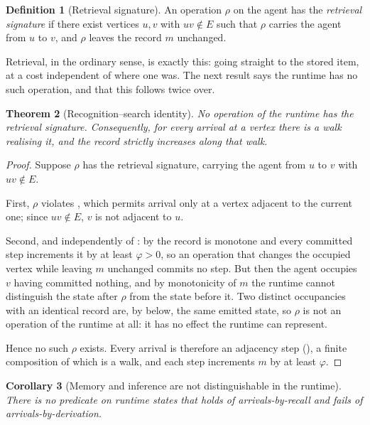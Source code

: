 \documentclass[11pt,a4paper]{article}
\theoremstyle{clstyle}
\newtheorem{theorem}{Theorem}[section]
\newtheorem{corollary}[theorem]{Corollary}
\theoremstyle{definition}
\newtheorem{definition}[theorem]{Definition}
\theoremstyle{remark}
\newcommand{\rec}{m}
\begin{document}
\begin{definition}[Retrieval signature]
\label{def:retrieval}
An operation $\rho$ on the agent has the \emph{retrieval signature} if there
exist vertices $u,v$ with $uv\notin E$ such that $\rho$ carries the agent
from $u$ to $v$, and $\rho$ leaves the record $\rec$ unchanged.
\end{definition}

Retrieval, in the ordinary sense, is exactly this: going straight to the
stored item, at a cost independent of where one was. The next result says
the runtime has no such operation, and that this follows twice over.

\begin{theorem}[Recognition--search identity]
\label{thm:recognition}
No operation of the runtime has the retrieval signature. Consequently, for
every arrival at a vertex there is a walk realising it, and the record
strictly increases along that walk.
\end{theorem}

\begin{proof}
Suppose $\rho$ has the retrieval signature, carrying the agent from $u$ to
$v$ with $uv\notin E$.

First, $\rho$ violates , which permits arrival only at a
vertex adjacent to the current one; since $uv\notin E$, $v$ is not adjacent
to $u$.

Second, and independently of : by  the
record is monotone and every committed step increments it by at least
$\varphi>0$, so an operation that changes the occupied vertex while leaving
$\rec$ unchanged commits no step. But then the agent occupies $v$ having
committed nothing, and by monotonicity of $\rec$ the runtime cannot
distinguish the state after $\rho$ from the state before it. Two distinct
occupancies with an identical record are, by  below, the
same emitted state, so $\rho$ is not an operation of the runtime at all: it
has no effect the runtime can represent.

Hence no such $\rho$ exists. Every arrival is therefore an adjacency step
(), a finite composition of which is a walk, and each step
increments $\rec$ by at least $\varphi$.
\end{proof}

\begin{corollary}[Memory and inference are not distinguishable in the runtime]
\label{cor:memoryinference}
There is no predicate on runtime states that holds of arrivals-by-recall and
fails of arrivals-by-derivation.
\end{corollary}
\end{document}
